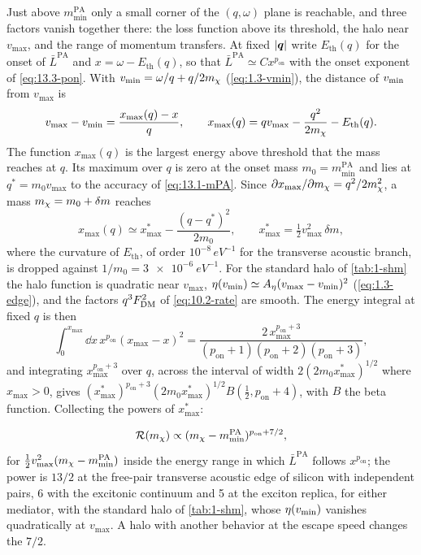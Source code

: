 Just above $m_{\mathrm{min}}^{\mathrm{PA}}$ only a small corner of the $(q,\omega)$ plane is reachable, and three factors vanish together there: the loss function above its threshold, the halo near $v_{\mathrm{max}}$, and the range of momentum transfers. At fixed $|\bm{q}|$ write $E_{\mathrm{th}}(q)$ for the onset of $\bar L^{\mathrm{PA}}$ and $x = \omega - E_{\mathrm{th}}(q)$, so that $\bar L^{\mathrm{PA}} \simeq Cx^{p_{\mathrm{on}}}$ with the onset exponent of \cref{eq:13.3-pon}. With $v_{\mathrm{min}} = \omega/q + q/2m_{\chi}$ (\cref{eq:1.3-vmin}), the distance of $v_{\mathrm{min}}$ from $v_{\mathrm{max}}$ is
\begin{equation*}
  v_{\mathrm{max}} - v_{\mathrm{min}} = \frac{x_{\max}(q) - x}{q} , \qquad x_{\max}(q) = qv_{\mathrm{max}} - \frac{q^2}{2m_{\chi}} - E_{\mathrm{th}}(q) .
\end{equation*}
The function $x_{\max}(q)$ is the largest energy above threshold that the mass reaches at $q$. Its maximum over $q$ is zero at the onset mass $m_0 = m_{\mathrm{min}}^{\mathrm{PA}}$ and lies at $q^* = m_0v_{\mathrm{max}}$ to the accuracy of \cref{eq:13.1-mPA}. Since $\partial x_{\max}/\partial m_{\chi} = q^2/2m_{\chi}^2$, a mass $m_{\chi} = m_0 + \delta m$ reaches
\begin{equation*}
  x_{\max}(q) \simeq x_{\max}^* - \frac{(q - q^*)^2}{2m_0} , \qquad x_{\max}^* = \tfrac12v_{\mathrm{max}}^2\,\delta m ,
\end{equation*}
where the curvature of $E_{\mathrm{th}}$, of order $10^{-8}\,\si{eV^{-1}}$ for the transverse acoustic branch, is dropped against $1/m_0 = \SI{3e-6}{eV^{-1}}$. For the standard halo of \cref{tab:1-shm} the halo function is quadratic near $v_{\mathrm{max}}$, $\eta(v_{\mathrm{min}}) \simeq A_\eta(v_{\mathrm{max}} - v_{\mathrm{min}})^2$ (\cref{eq:1.3-edge}), and the factors $q^3F_{\mathrm{DM}}^2$ of \cref{eq:10.2-rate} are smooth. The energy integral at fixed $q$ is then
\begin{equation*}
  \int_0^{x_{\max}}\dd x\,x^{p_{\mathrm{on}}}(x_{\max} - x)^2 = \frac{2\,x_{\max}^{p_{\mathrm{on}}+3}}{(p_{\mathrm{on}}+1)(p_{\mathrm{on}}+2)(p_{\mathrm{on}}+3)} ,
\end{equation*}
and integrating $x_{\max}^{p_{\mathrm{on}}+3}$ over $q$, across the interval of width $2(2m_0x_{\max}^*)^{1/2}$ where $x_{\max} > 0$, gives $(x_{\max}^*)^{p_{\mathrm{on}}+3}(2m_0x_{\max}^*)^{1/2}B(\tfrac12, p_{\mathrm{on}}+4)$, with $B$ the beta function. Collecting the powers of $x_{\max}^*$:
\begin{keyresult}
\begin{equation}
  \mathcal{R}(m_{\chi}) \propto (m_{\chi} - m_{\mathrm{min}}^{\mathrm{PA}})^{p_{\mathrm{on}} + 7/2} ,
  \label{eq:13.9-medge}
\end{equation}
for $\tfrac12v_{\mathrm{max}}^2(m_{\chi} - m_{\mathrm{min}}^{\mathrm{PA}})$ inside the energy range in which $\bar L^{\mathrm{PA}}$ follows $x^{p_{\mathrm{on}}}$; the power is $13/2$ at the free-pair transverse acoustic edge of silicon with independent pairs, 6 with the excitonic continuum and 5 at the exciton replica, for either mediator, with the standard halo of \cref{tab:1-shm}, whose $\eta(v_{\mathrm{min}})$ vanishes quadratically at $v_{\mathrm{max}}$. A halo with another behavior at the escape speed changes the $7/2$.
\end{keyresult}
